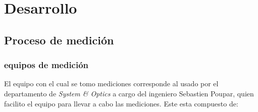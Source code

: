 \chapter{Desarrollo}
    \section{Proceso de medición}
         \subsection{equipos de medición}
            El equipo con el cual se tomo mediciones corresponde al usado por el departamento de \textit{System \& Optics} a cargo del ingeniero Sebastien Poupar, quien facilito el equipo para llevar a cabo las mediciones. Este esta compuesto de:           
            
